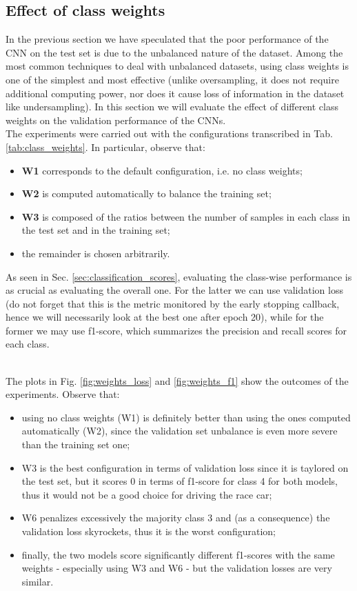 \subsection{Effect of class weights}
\label{sec:effect_of_class_weights}
In the previous section we have speculated that the poor performance of the CNN on the test set is due to the unbalanced nature of the dataset. Among the most common techniques to deal with unbalanced datasets, using class weights is one of the simplest and most effective (unlike oversampling, it does not require additional computing power, nor does it cause loss of information in the dataset like undersampling). In this section we will evaluate the effect of different class weights on the validation performance of the CNNs.
\\ The experiments were carried out with the configurations transcribed in Tab. \ref{tab:class_weights}. In particular, observe that:
\begin{itemize}
    \item \textbf{W1} corresponds to the default configuration, i.e. no class weights;
    \item \textbf{W2} is computed automatically to balance the training set;
    \item \textbf{W3} is composed of the ratios between the number of samples in each class in the test set and in the training set;
    \item the remainder is chosen arbitrarily.
\end{itemize}



\noindent As seen in Sec. \ref{sec:classification_scores}, evaluating the class-wise performance is as crucial as evaluating the overall one. For the latter we can use validation loss (do not forget that this is the metric monitored by the early stopping callback, hence we will necessarily look at the best one after epoch 20), while for the former we may use f1-score, which summarizes the precision and recall scores for each class. 

\noindent \\The plots in Fig. \ref{fig:weights_loss} and \ref{fig:weights_f1} show the outcomes of the experiments. Observe that:
\begin{itemize}
    \item using no class weights (W1) is definitely better than using the ones computed automatically (W2), since the validation set unbalance is even more severe than the training set one;
    \item W3 is the best configuration in terms of validation loss since it is taylored on the test set, but it scores 0 in terms of f1-score for class 4 for both models, thus it would not be a good choice for driving the race car;
    \item W6 penalizes excessively the majority class 3 and (as a consequence) the validation loss skyrockets, thus it is the worst configuration;
    \item finally, the two models score significantly different f1-scores with the same weights - especially using W3 and W6 - but the validation losses are very similar.
\end{itemize}

